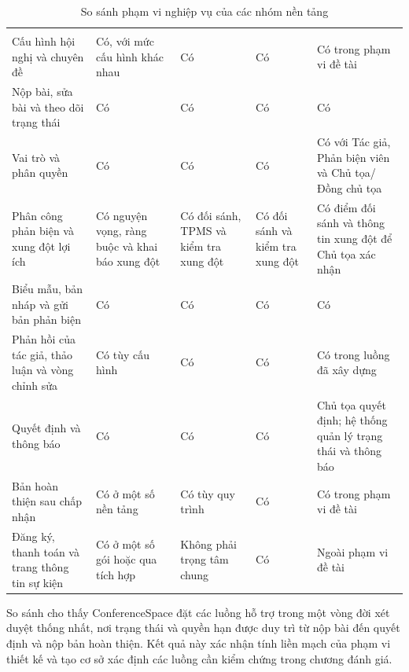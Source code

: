 \begingroup
\setlength{\tabcolsep}{3pt}
\setlength{\LTleft}{0pt plus \textwidth}
\setlength{\LTright}{0pt plus \textwidth}
\begin{longtable}{|P{0.18\textwidth}|P{0.18\textwidth}|P{0.18\textwidth}|P{0.18\textwidth}|P{0.20\textwidth}|}
  \caption{So sánh phạm vi nghiệp vụ của các nhóm nền tảng}\\
\hline
{} &  &  &  &  \\ \hline
\endfirsthead
\hline
{} &  &  &  &  \\ \hline
\endhead
\hline
\endfoot
Cấu hình hội nghị và chuyên đề & Có, với mức cấu hình khác nhau & Có & Có & Có trong phạm vi đề tài \\ \hline
Nộp bài, sửa bài và theo dõi trạng thái & Có & Có & Có & Có \\ \hline
Vai trò và phân quyền & Có & Có & Có & Có với Tác giả, Phản biện viên và Chủ tọa/Đồng chủ tọa \\ \hline
Phân công phản biện và xung đột lợi ích & Có nguyện vọng, ràng buộc và khai báo xung đột & Có đối sánh, TPMS và kiểm tra xung đột & Có đối sánh và kiểm tra xung đột & Có điểm đối sánh và thông tin xung đột để Chủ tọa xác nhận \\ \hline
Biểu mẫu, bản nháp và gửi bản phản biện & Có & Có & Có & Có \\ \hline
Phản hồi của tác giả, thảo luận và vòng chỉnh sửa & Có tùy cấu hình & Có & Có & Có trong luồng đã xây dựng \\ \hline
Quyết định và thông báo & Có & Có & Có & Chủ tọa quyết định; hệ thống quản lý trạng thái và thông báo \\ \hline
Bản hoàn thiện sau chấp nhận & Có ở một số nền tảng & Có tùy quy trình & Có & Có trong phạm vi đề tài \\ \hline
Đăng ký, thanh toán và trang thông tin sự kiện & Có ở một số gói hoặc qua tích hợp & Không phải trọng tâm chung & Có & Ngoài phạm vi đề tài \\ \hline
\end{longtable}
\endgroup

So sánh cho thấy ConferenceSpace đặt các luồng hỗ trợ trong một vòng đời xét duyệt thống nhất, nơi trạng thái và quyền hạn được duy trì từ nộp bài đến quyết định và nộp bản hoàn thiện. Kết quả này xác nhận tính liền mạch của phạm vi thiết kế và tạo cơ sở xác định các luồng cần kiểm chứng trong chương đánh giá.

